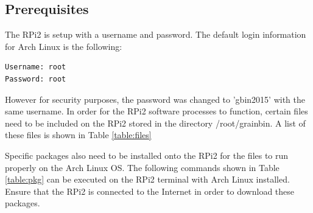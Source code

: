 \subsection{Prerequisites} The RPi2 is setup with a username and password.  The default login information for Arch Linux is
the following:

\begin{verbatim}
Username: root 
Password: root
\end{verbatim}

However for security purposes, the password was changed to 'gbin2015' with the same username.
\newline
In order for the RPi2 software processes to function, certain files need to be included on the RPi2 stored in the directory
/root/grainbin. A list of these files is shown in Table \ref{table:files}

\begin{table}[h]
\centering
\caption{Required files in the /root/grainbin directory of the Raspberry Pi 2.}
\label{table:files}
\end{table}

Specific packages also need to be installed onto the RPi2 for the files to run properly on the Arch Linux OS. The following
commands shown in Table \ref{table:pkg} can be executed on the RPi2 terminal with Arch Linux installed.  Ensure that the RPi2 is connected to the Internet in order to download these packages.

